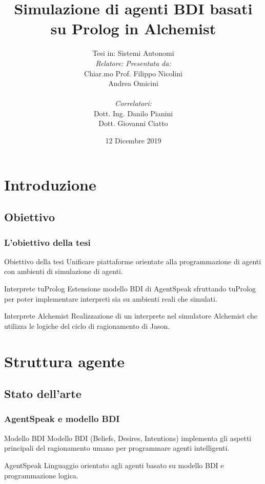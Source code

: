 \documentclass[handout]{beamer}\mode<presentation>{\usetheme{AMSCesenaBleu}}
\title[Prolog BDI agents on Alchemist]{Simulazione di agenti BDI basati su Prolog in Alchemist}
\author[Filippo Nicolini]{Tesi in: Sistemi Autonomi\\
[0.5cm]
\textit{Relatore:} \hspace{6.55cm} \textit{Presentata da:}\\
Chiar.mo Prof. \hspace{5.5cm} Filippo Nicolini\\
Andrea Omicini \hspace{7.6cm} \phantom{g}\\
\textit{\\Correlatori:} \hspace{8.25cm} \phantom{g}\\
Dott. Ing. Danilo Pianini \hspace{6cm} \phantom{g}\\
Dott. Giovanni Ciatto \hspace{6.5cm} \phantom{g}\\
}
\institute[]{
\textsc{Alma Mater Studiorum} -- Università di Bologna \\
Campus di Cesena}
\date{12 Dicembre 2019}
\begin{document}
\maketitle


\section{Introduzione}

\subsection{Obiettivo}
\begin{frame}
\frametitle{L'obiettivo della tesi}
\begin{block}{Obiettivo della tesi}
\alert{Unificare} piattaforme orientate alla \alert{programmazione di agenti} con ambienti di \alert{simulazione di agenti}.
\end{block}

\begin{block}{Interprete tuProlog}
Estensione modello BDI di AgentSpeak sfruttando tuProlog per poter implementare interpreti sia su ambienti reali che simulati.
\end{block}

\begin{block}{Interprete Alchemist}
Realizzazione di un interprete nel simulatore Alchemist che utilizza le logiche del ciclo di ragionamento di Jason.
\end{block}
\end{frame}


\section{Struttura agente}

\subsection{Stato dell'arte}

\begin{frame}
\frametitle{AgentSpeak e modello BDI}
\begin{block}{Modello BDI}
Modello BDI (Beliefs, Desires, Intentions) implementa gli aspetti principali del ragionamento umano per programmare agenti intelligenti.
\end{block}
\begin{block}{AgentSpeak}
Linguaggio orientato agli agenti basato su modello BDI e programmazione logica.
\end{block}
\end{frame}
\end{document}
